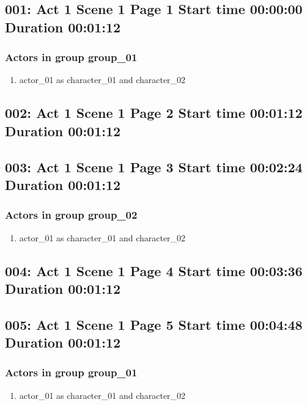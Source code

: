 \subsection{001: Act 1 Scene 1 Page 1 Start time 00:00:00 Duration 00:01:12}

\subsubsection{Actors in group group\_01}
\begin{enumerate}
\item actor\_01 as character\_01 and character\_02
\end{enumerate}


\subsection{002: Act 1 Scene 1 Page 2 Start time 00:01:12 Duration 00:01:12}

\subsection{003: Act 1 Scene 1 Page 3 Start time 00:02:24 Duration 00:01:12}

\subsubsection{Actors in group group\_02}
\begin{enumerate}
\item actor\_01 as character\_01 and character\_02
\end{enumerate}


\subsection{004: Act 1 Scene 1 Page 4 Start time 00:03:36 Duration 00:01:12}

\subsection{005: Act 1 Scene 1 Page 5 Start time 00:04:48 Duration 00:01:12}

\subsubsection{Actors in group group\_01}
\begin{enumerate}
\item actor\_01 as character\_01 and character\_02
\end{enumerate}
